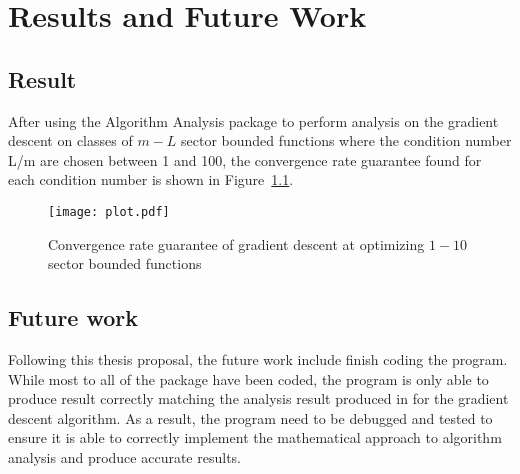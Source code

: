 \chapter{Results and Future Work}\label{chapter:Conclusion}
\section{Result}
After using the Algorithm Analysis package to perform analysis on the gradient descent on classes of $m-L$ sector bounded functions where the condition number L/m are chosen between 1 and 100, the convergence rate guarantee found for each condition number is shown in Figure~\ref{plot_result}.

    
    

\begin{figure}[h]
    \centering
    \texttt{[image: plot.pdf]}
    \caption{Convergence rate guarantee of gradient descent at optimizing $1-10$ sector bounded functions}
    \label{plot_result}
\end{figure}

\section{Future work}
Following this thesis proposal, the future work include finish coding the program. While most to all of the package have been coded, the program is only able to produce result correctly matching the analysis result produced in \cite{tutorial} for the gradient descent algorithm. As a result, the program need to be debugged and tested to ensure it is able to correctly implement the mathematical approach to algorithm analysis and produce accurate results.

